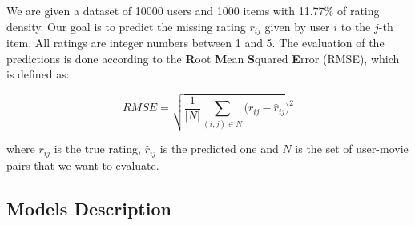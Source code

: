 \documentclass[10pt,conference,compsocconf]{IEEEtran}
\begin{document}
We are given a dataset of 10000 users and 1000 items with 11.77\% of rating density. Our goal is to predict the missing rating $r_{ij}$ given by user $i$ to the $j$-th item. All ratings are integer numbers between 1 and 5. The evaluation of the predictions is done according to the \textbf{R}oot \textbf{M}ean \textbf{S}quared \textbf{E}rror (RMSE), which is defined as:

$$
RMSE = \sqrt{\frac{1}{\vert N \vert} \sum_{(i,j)\in N} (r_{ij} - \hat{r}_{ij}})^2
$$

\noindent where $r_{ij}$ is the true rating, $\hat{r}_{ij}$ is the predicted one and $N$ is the set of user-movie pairs that we want to evaluate.

\subsection{Models Description}

\end{document}
